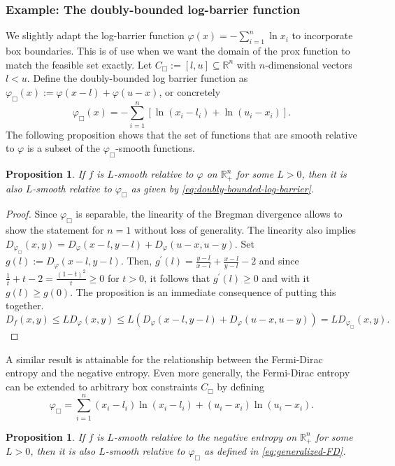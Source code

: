 \documentclass[11pt,reqno]{amsart}
\numberwithin{equation}{section}
\numberwithin{figure}{section}
\theoremstyle{plain}
\newtheorem{proposition}[theorem]{Proposition}
\theoremstyle{definition}
\newcommand{\R}{\mathbb{R}}
\newcommand{\vphi}{\varphi}
\begin{document}
\subsubsection{Example: The doubly-bounded log-barrier function} \label{sec:adapt-log-barrier}
We slightly adapt the log-barrier function $\vphi(x) = - \sum_{i = 1}^n \ln x_i$ to incorporate box boundaries. This is of use when we want the domain of the prox function to match the feasible set exactly. Let $C_\Box := [l,u] \subseteq \R^n$ with $n$-dimensional vectors $l < u$. Define the doubly-bounded log barrier function as $\vphi_\Box(x) := \vphi(x-l) + \vphi(u-x)$, or concretely
    \begin{equation} \label{eq:doubly-bounded-log-barrier}
        \vphi_\Box(x) = -\sum_{i=1}^{n} \left[ \ln (x_i-l_i) + \ln(u_i-x_i)\right].
    \end{equation}
    The following proposition shows that the set of functions that are smooth relative to $\vphi$ is a subset of the $\vphi_\Box$-smooth functions. 
    \begin{proposition} \label{prop:log-barrier-orthant-to-box}
        If $f$ is $L$-smooth relative to $\vphi$ on $\R^n_{+}$ for some $L > 0$, then it is also $L$-smooth relative to $\vphi_\Box$ as given by \eqref{eq:doubly-bounded-log-barrier}. 
    \end{proposition}
    \begin{proof}
    Since $\vphi_\Box$ is separable, the linearity of the Bregman divergence allows to show the statement for $n = 1$ without loss of generality. The linearity also implies $D_{\vphi_\Box}(x,y) = D_\vphi(x-l, y-l)+D_\vphi(u-x, u-y)$. Set $g(l):= D_\vphi(x-l, y-l)$. Then, $g^\prime(l) = \frac{y-l}{x-l} + \frac{x-l}{y-l} - 2$ and since $\frac{1}{t} + t - 2 = \frac{(1-t)^2}{t} \geq 0$ for $t > 0$, it follows that $g^\prime(l) \geq 0$ and with it $g(l) \geq g(0)$. The proposition is an immediate consequence of putting this together.
    \begin{equation}
        D_f(x,y) \leq L D_\vphi(x,y) \leq L(D_\vphi(x-l, y-l) + D_\vphi(u-x, u-y)) = LD_{\vphi_\Box}(x,y).
    \end{equation}
    \end{proof}
A similar result is attainable for the relationship between the Fermi-Dirac entropy and the negative entropy. Even more generally, the Fermi-Dirac entropy can be extended to arbitrary box constraints $C_\Box$ by defining
\begin{equation} \label{eq:generalized-FD}
    \vphi_\Box = \sum_{i = 1}^n (x_i - l_i) \ln(x_i - l_i) + (u_i - x_i) \ln(u_i - x_i).
\end{equation}
\begin{proposition}{\cite[Lemma 3]{Petra2013a}} \label{prop:nnentropy-to-FD}
    If $f$ is $L$-smooth relative to the negative entropy on $\R^n_{+}$ for some $L > 0$, then it is also $L$-smooth relative to $\vphi_\Box$ as defined in \eqref{eq:generalized-FD}.
\end{proposition}
\end{document}
